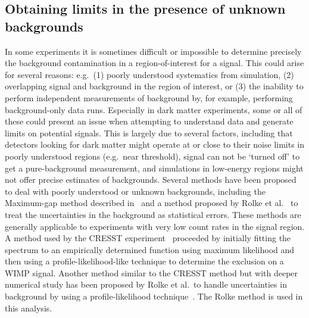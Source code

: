 	\subsection{Obtaining limits in the presence of unknown backgrounds}
	\label{sec:LimitsUnknownBackgroundML}	
	
In some experiments it is sometimes difficult or impossible to determine precisely the background contamination in a region-of-interest for a signal.  This could arise for several reasons: e.g.~(1) poorly understood systematics from simulation, (2) overlapping signal and background in the region of interest, or (3) the inability to perform independent measurements of background by, for example, performing background-only data runs.  Especially in dark matter experiments, some or all of these could present an issue when attempting to understand data and generate limits on potential signals.  This is largely due to several factors, including that detectors looking for dark matter might operate at or close to their noise limits in poorly understood regions (e.g.~near threshold), signal can not be `turned off' to get a pure-background measurement, and simulations in low-energy regions might not offer precise estimates of backgrounds.  Several methods have been proposed to deal with poorly understood or unknown backgrounds, including the Maximum-gap method described in~\cite{Yell02} and a method proposed by Rolke et al.~\cite{Rolke2001} to treat the uncertainties in the background as statistical errors.  These methods are generally applicable to experiments with very low count rates in the signal region.  A method used by the CRESST experiment~\cite{Anglo2002} proceeded by initially fitting the spectrum to an empirically determined function using maximum likelihood and then using a profile-likelihood-like technique to determine the exclusion on a WIMP signal.  Another method similar to the CRESST method but with deeper numerical study has been proposed by Rolke et al.~to handle uncertainties in background by using a profile-likelihood technique~\cite{Rol05}.  The Rolke method is used in this analysis.  

